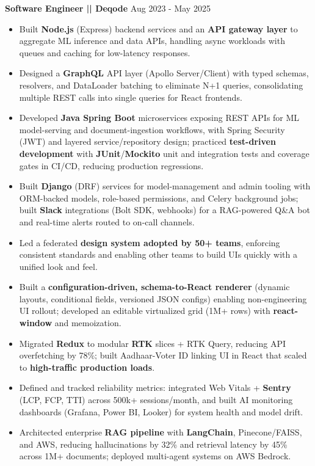 \documentclass[a4paper]{article}
\begin{document}
\vspace{4pt}
\textbf{Software Engineer || Deqode}
\hfill Aug 2023 - May 2025
\begin{itemize}
\vspace{1pt}
\item {Built \textbf{Node.js} (Express) backend services and an \textbf{API gateway layer} to aggregate ML inference and data APIs, handling async workloads with queues and caching for low-latency responses.}
\item {Designed a \textbf{GraphQL} API layer (Apollo Server/Client) with typed schemas, resolvers, and DataLoader batching to eliminate N+1 queries, consolidating multiple REST calls into single queries for React frontends.}
\item {Developed \textbf{Java Spring Boot} microservices exposing REST APIs for ML model-serving and document-ingestion workflows, with Spring Security (JWT) and layered service/repository design; practiced \textbf{test-driven development} with \textbf{JUnit}/\textbf{Mockito} unit and integration tests and coverage gates in CI/CD, reducing production regressions.}
\item {Built \textbf{Django} (DRF) services for model-management and admin tooling with ORM-backed models, role-based permissions, and Celery background jobs; built \textbf{Slack} integrations (Bolt SDK, webhooks) for a RAG-powered Q\&A bot and real-time alerts routed to on-call channels.}
\item {Led a federated \textbf{design system adopted by 50+ teams}, enforcing consistent standards and enabling other teams to build UIs quickly with a unified look and feel.}
\item {Built a \textbf{configuration-driven, schema-to-React renderer} (dynamic layouts, conditional fields, versioned JSON configs) enabling non-engineering UI rollout; developed an editable virtualized grid (1M+ rows) with \textbf{react-window} and memoization.}
\item {Migrated \textbf{Redux} to modular \textbf{RTK} slices + RTK Query, reducing API overfetching by 78\%; built Aadhaar-Voter ID linking UI in React that scaled to \textbf{high-traffic production loads}.}
\item {Defined and tracked reliability metrics: integrated Web Vitals + \textbf{Sentry} (LCP, FCP, TTI) across 500k+ sessions/month, and built AI monitoring dashboards (Grafana, Power BI, Looker) for system health and model drift.}
\item {Architected enterprise \textbf{RAG pipeline} with \textbf{LangChain}, Pinecone/FAISS, and AWS, reducing hallucinations by 32\% and retrieval latency by 45\% across 1M+ documents; deployed multi-agent systems on AWS Bedrock.}

\end{itemize}
\end{document}
